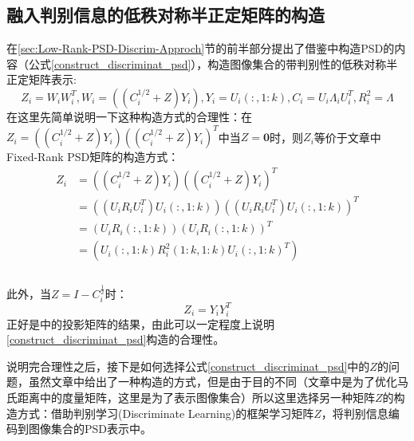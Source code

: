 \subsection{融入判别信息的低秩对称半正定矩阵的构造}
\label{sec:discrim_Low_Rank_PSD}
在\ref{sec:Low-Rank-PSD-Discrim-Approch}节的前半部分提出了借鉴\cite{PSD_AAAI}中构造PSD的内容（公式\ref{construct_discriminat_psd}），构造图像集合的带判别性的低秩对称半正定矩阵表示:
\begin{equation}
\label{construct_discriminat_psd}
Z_{i}=W_iW_{i}^{T},W_{i}=\left((C_{i}^{1/2}+Z) Y_{i}\right),Y_{i}=U_{i}(:,1:k),C_i=U_i\Lambda_iU_{i}^{T},R_{i}^{2}=\Lambda
\end{equation}
在这里先简单说明一下这种构造方式的合理性：在$Z_{i}=\left((C_{i}^{1/2}+Z)Y_{i}\right)\left((C_{i}^{1/2}+Z)Y_{i}\right)^{T}$中当$Z=\bm{0}$时，则$Z_{i}$等价于文章\cite{PSD_WACV}中Fixed-Rank PSD矩阵的构造方式：
\begin{equation}
\label{Fixed-Rank-PSD-Z0}
\begin{split}
Z_{i}&=\left((C_{i}^{1/2}+Z)Y_{i}\right)\left((C_{i}^{1/2}+Z)Y_{i}\right)^{T}\\
&=\left((U_{i}R_{i}U_{i}^{T})U_{i}(:,1:k)\right)\left((U_{i}R_{i}U_{i}^{T})U_{i}(:,1:k)\right)^{T}\\
&=\left(U_{i}R_{i}(:,1:k)\right)\left(U_{i}R_{i}(:,1:k)\right)^{T}\\
&=\left(U_{i}(:,1:k)R_{i}^{2}(1:k,1:k)U_{i}(:,1:k)^{T}\right)\\
\end{split}
\end{equation}\\
此外，当$Z=I-C_{i}^{\frac{1}{2}}$时：
\begin{equation}
\label{Fixed-Rank_PSD-Z_neg}
Z_i=Y_{i}Y_{i}^{T}
\end{equation}
正好是\cite{Subspace_GDA}中的投影矩阵的结果，由此可以一定程度上说明\ref{construct_discriminat_psd}构造的合理性。

说明完合理性之后，接下是如何选择公式\ref{construct_discriminat_psd}中的$Z$的问题，虽然文章\cite{PSD_AAAI}中给出了一种构造的方式，但是由于目的不同（文章\cite{PSD_AAAI}中是为了优化马氏距离中的度量矩阵，这里是为了表示图像集合）所以这里选择另一种矩阵$Z$的构造方式：借助判别学习(Discriminate Learning)的框架学习矩阵$Z$，将判别信息编码到图像集合的PSD表示中。

